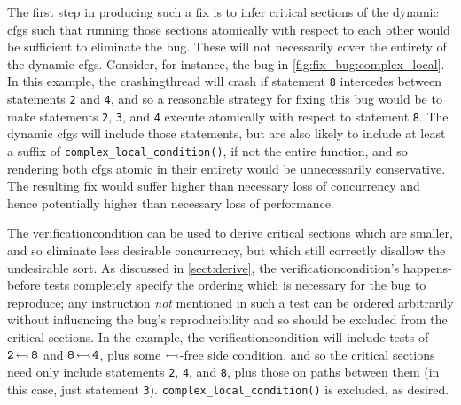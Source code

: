 \noindent
The first step in producing such a fix is to infer critical sections
of the dynamic \glspl{cfg} such that running those sections atomically
with respect to each other would be sufficient to eliminate the bug.
These will not necessarily cover the entirety of the dynamic
\glspl{cfg}.  Consider, for instance, the bug in
\autoref{fig:fix_bug:complex_local}.  In this example, the
\gls{crashingthread} will crash if statement \texttt{8} intercedes
between statements \texttt{2} and \texttt{4}, and so a reasonable
strategy for fixing this bug would be to make statements \texttt{2},
\texttt{3}, and \texttt{4} execute atomically with respect to
statement \texttt{8}.  The dynamic \glspl{cfg} will include those
statements, but are also likely to include at least a suffix of
\texttt{complex\_local\_condition()}, if not the entire function, and
so rendering both \glspl{cfg} atomic in their entirety would be
unnecessarily conservative.  The resulting fix would suffer higher
than necessary loss of concurrency and hence potentially higher than
necessary loss of performance.

The \gls{verificationcondition} can be used to derive critical
sections which are smaller, and so eliminate less desirable
concurrency, but which still correctly disallow the undesirable sort.
As discussed in \autoref{sect:derive}, the
\gls{verificationcondition}'s happens-before tests completely specify
the ordering which is necessary for the bug to reproduce; any
instruction \emph{not} mentioned in such a test can be ordered
arbitrarily without influencing the bug's reproducibility and so
should be excluded from the critical sections.  In the example, the
\gls{verificationcondition} will include tests of $\tt
  2\,{\leftarrowtail}\,\tt 8$ and $\tt 8\,{\leftarrowtail}\,\tt 4$, plus some
$\leftarrowtail$-free \gls{side condition}, and so the critical
sections need only include statements \texttt{2}, \texttt{4}, and
\texttt{8}, plus those on paths between them (in this case, just
statement \texttt{3}).  \texttt{complex\_local\_condition()} is
excluded, as desired.


